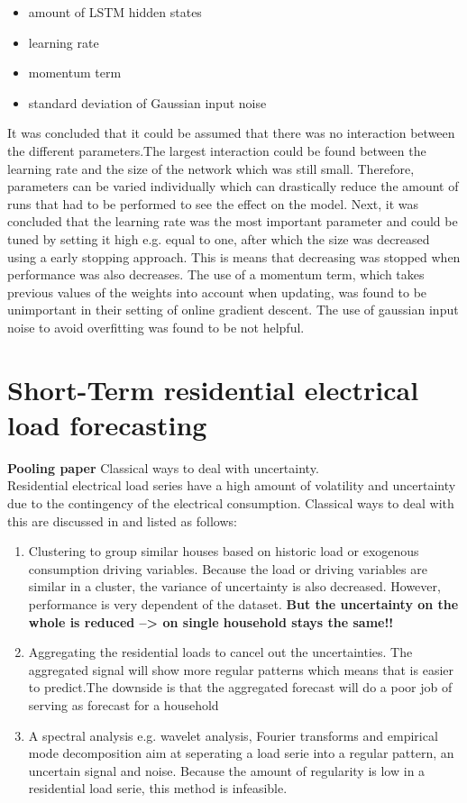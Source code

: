 \begin{itemize}
	\item amount of LSTM hidden states
	\item learning rate
	\item momentum term
	\item standard deviation of Gaussian input noise
\end{itemize}

It was concluded that it could be assumed that there was no interaction between the different parameters.The largest interaction could be found between the learning rate and the size of the network which was still small. Therefore, parameters can be varied individually which can drastically reduce the amount of runs that had to be performed to see the effect on the model. Next, it was concluded that the learning rate was the most important parameter and could be tuned by setting it high e.g. equal to one, after which the size was decreased using a early stopping approach. This is means that decreasing was stopped when performance was also decreases. The use of a momentum term, which takes previous values of the weights into account when updating, was found to be unimportant in their setting of online gradient descent. The use of gaussian input noise to avoid overfitting was found to be not helpful. 

\section{Short-Term residential electrical load forecasting}\label{s:Short-Term residential electrical load forecasting}
\textbf{Pooling paper}
Classical ways to deal with uncertainty.\\
Residential electrical load series have a high amount of volatility and uncertainty due to the contingency of the electrical consumption. Classical ways to deal with this are discussed in \cite{Shi2018} and listed as follows:
\begin{enumerate}
	\item Clustering to group similar houses based on historic load or exogenous consumption driving variables. Because the load or driving variables are similar in a cluster, the variance of uncertainty is also decreased. However, performance is very dependent of the dataset. \textbf{But the uncertainty on the whole is reduced --> on single household stays the same!!}
	\item Aggregating the residential loads to cancel out the uncertainties. The aggregated signal will show more regular patterns which means that is easier to predict.The downside is that the aggregated forecast will do a poor job of serving as forecast for a household
	\item A spectral analysis e.g. wavelet analysis, Fourier transforms and empirical mode decomposition aim at seperating a load serie into a regular pattern, an uncertain signal and noise. Because the amount of regularity is low in a residential load serie, this method is infeasible.
\end{enumerate}



